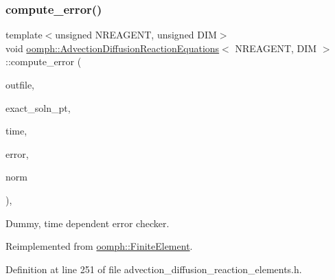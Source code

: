 \subsubsection{\texorpdfstring{compute\+\_\+error()}{compute\_error()}\hspace{0.1cm}{\footnotesize\ttfamily [2/2]}}
{\footnotesize\ttfamily template$<$unsigned N\+R\+E\+A\+G\+E\+NT, unsigned D\+IM$>$ \\
void \hyperlink{classoomph_1_1AdvectionDiffusionReactionEquations}{oomph\+::\+Advection\+Diffusion\+Reaction\+Equations}$<$ N\+R\+E\+A\+G\+E\+NT, D\+IM $>$\+::compute\+\_\+error (\begin{DoxyParamCaption}\item[{std\+::ostream \&}]{outfile,  }\item[{\hyperlink{classoomph_1_1FiniteElement_ad4ecf2b61b158a4b4d351a60d23c633e}{Finite\+Element\+::\+Unsteady\+Exact\+Solution\+Fct\+Pt}}]{exact\+\_\+soln\+\_\+pt,  }\item[{const double \&}]{time,  }\item[{double \&}]{error,  }\item[{double \&}]{norm }\end{DoxyParamCaption})\hspace{0.3cm}{\ttfamily [inline]}, {\ttfamily [virtual]}}



Dummy, time dependent error checker. 



Reimplemented from \hyperlink{classoomph_1_1FiniteElement_a7f67853506dc73fa6b7505108de22d1f}{oomph\+::\+Finite\+Element}.



Definition at line 251 of file advection\+\_\+diffusion\+\_\+reaction\+\_\+elements.\+h.

\mbox{\label{classoomph_1_1AdvectionDiffusionReactionEquations_adf47eb6be16a1d42bdb4019fde6f4b82}} 
